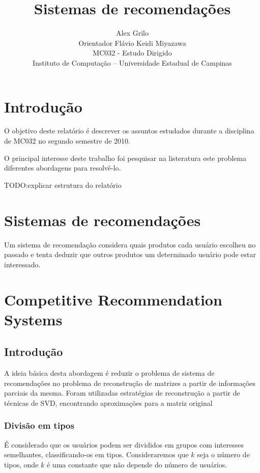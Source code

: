 \documentclass[a4paper,10pt]{article}
\title{Sistemas de recomendações}
\author{Alex Grilo \\ Orientador Flávio Keidi Miyazawa\\ MC032 - Estudo Dirigido \\ \normalsize{Instituto de Computação -- Universidade Estadual de Campinas}}
\begin{document}
\maketitle

\newtheorem{definicao}{Definição}
\newtheorem{lema}{Lema}
\newtheorem{coro}{Corolário}
\newtheorem{teo}{Teorema}


\section{Introdução}

O objetivo deste relatório é descrever os assuntos estudados durante a 
disciplina de MC032 no segundo semestre de 2010. 

O principal interesse deste trabalho foi pesquisar na listeratura este
problema diferentes abordagens para resolvê-lo.

TODO:explicar estrutura do relatório

\newpage

\section{Sistemas de recomendações}

Um sistema de recomendação considera quais produtos cada usuário
escolheu no passado e tenta deduzir que outros produtos um determinado
usuário pode estar interessado. 

\newpage

\section{Competitive Recommendation Systems}

\subsection{Introdução}

A ideia básica desta abordagem é reduzir o problema de sistema de recomendações
no problema de reconstrução de matrizes a partir de informações parciais da mesma. 
Foram utilizadas estratégias de reconstrução a partir de técnicas de SVD, encontrando
aproximações para a matriz original 

\subsubsection{Divisão em tipos}
É considerado que os usuários podem ser divididos em grupos com interesses semelhantes,
classificando-os em tipos. Consideraremos que $k$ seja o número de tipos, onde $k$ é
uma constante que não depende do número de usuários.
\end{document}
